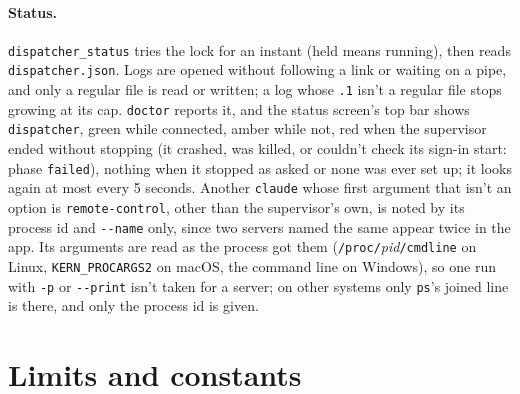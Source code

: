 \documentclass[10pt,a4paper]{article}
\newcommand{\code}[1]{\texttt{#1}}
\begin{document}
\paragraph{Status.} \code{dispatcher\_status} tries the lock for an instant (held means
running), then reads \code{dispatcher.json}. Logs are opened without following a link or waiting
on a pipe, and only a regular file is read or written; a log whose \code{.1} isn't a regular
file stops growing at its cap. \code{doctor} reports it, and the status screen's top bar shows
\code{\textbullet{} dispatcher}, green while connected, amber while not, red when the supervisor
ended without stopping (it crashed, was killed, or couldn't check its sign-in start: phase
\code{failed}), nothing when it stopped as asked or none was ever set up; it looks again at most every 5 seconds. Another
\code{claude} whose first argument that isn't an option is \code{remote-control}, other than the
supervisor's own, is noted by its process id and \code{-{}-name} only, since two servers named the
same appear twice in the app. Its arguments are read as the process got them
(\code{/proc/}\textit{pid}\code{/cmdline} on Linux, \code{KERN\_PROCARGS2} on macOS, the command
line on Windows), so one run with \code{-p} or \code{-{}-print} isn't taken for a server; on other
systems only \code{ps}'s joined line is there, and only the process id is given.

\section{Limits and constants}
\end{document}
